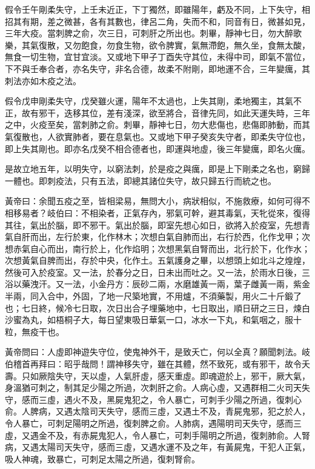假令壬午剛柔失守，上壬未近正，下丁獨然，即雖陽年，虧及不同，上下失守，相招其有期，差之微甚，各有其數也，律呂二角，失而不和，同音有日，微甚如見，三年大疫。當刺脾之俞，次三日，可刺肝之所出也。刺畢，靜神七日，勿大醉歌樂，其氣復散，又勿飽食，勿食生物，欲令脾實，氣無滯飽，無久坐，食無太酸，無食一切生物，宜甘宜淡。又或地下甲子丁酉失守其位，未得中司，即氣不當位，下不與壬奉合者，亦名失守，非名合德，故柔不附剛，即地運不合，三年變癘，其刺法亦如木疫之法。

假令戊申剛柔失守，戊癸雖火運，陽年不太過也，上失其剛，柔地獨主，其氣不正，故有邪干，迭移其位，差有淺深，欲至將合，音律先同，如此天運失時，三年之中，火疫至矣，當刺肺之俞。刺畢，靜神七日，勿大悲傷也，悲傷即肺動，而其氣復散也，人欲實肺者，要在息氣也。又或地下甲子癸亥失守者，即柔失守位也，即上失其剛也。即亦名戊癸不相合德者也，即運與地虛，後三年變癘，即名火癘。

是故立地五年，以明失守，以窮法刺，於是疫之與癘，即是上下剛柔之名也，窮歸一體也。即刺疫法，只有五法，即總其諸位失守，故只歸五行而統之也。

黃帝曰：余聞五疫之至，皆相梁易，無問大小，病狀相似，不施救療，如何可得不相移易者？岐伯曰：不相染者，正氣存內，邪氣可幹，避其毒氣，天牝從來，復得其往，氣出於腦，即不邪干。氣出於腦，即室先想心如日，欲將入於疫室，先想青氣自肝而出，左行於東，化作林木；次想白氣自肺而出，右行於西，化作戈甲；次想赤氣自心而出，南行於上，化作焰明；次想黑氣自腎而出，北行於下，化作水；次想黃氣自脾而出，存於中央，化作土。五氣護身之畢，以想頭上如北斗之煌煌，然後可入於疫室。又一法，於春分之日，日未出而吐之。又一法，於雨水日後，三浴以藥洩汗。又一法，小金丹方：辰砂二兩，水磨雄黃一兩，葉子雌黃一兩，紫金半兩，同入合中，外固，了地一尺築地實，不用爐，不須藥製，用火二十斤鍛了也；七日終，候冷七日取，次日出合子埋藥地中，七日取出，順日研之三日，煉白沙蜜為丸，如梧桐子大，每日望東吸日華氣一口，冰水一下丸，和氣咽之，服十粒，無疫干也。

黃帝問曰：人虛即神遊失守位，使鬼神外干，是致夭亡，何以全真？願聞刺法。岐伯稽首再拜曰：昭乎哉問！謂神移失守，雖在其體，然不致死，或有邪干，故令夭壽。只如厥陰失守，天以虛，人氣肝虛，感天重虛。即魂遊於上，邪干，厥大氣，身溫猶可刺之，制其足少陽之所過，次刺肝之俞。人病心虛，又遇群相二火司天失守，感而三虛，遇火不及，黑屍鬼犯之，令人暴亡，可刺手少陽之所過，復刺心俞。人脾病，又遇太陰司天失守，感而三虛，又遇土不及，青屍鬼邪，犯之於人，令人暴亡，可刺足陽明之所過，復刺脾之俞。人肺病，遇陽明司天失守，感而三虛，又遇金不及，有赤屍鬼犯人，令人暴亡，可刺手陽明之所過，復刺肺俞。人腎病，又遇太陽司天失守，感而三虛，又遇水運不及之年，有黃屍鬼，干犯人正氣，吸人神魂，致暴亡，可刺足太陽之所過，復刺腎俞。

